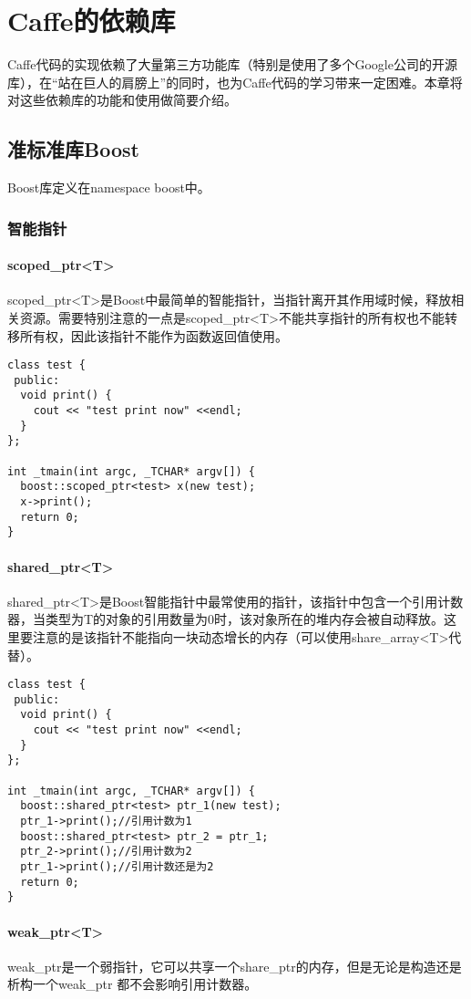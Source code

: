 \chapter{Caffe的依赖库}
Caffe代码的实现依赖了大量第三方功能库（特别是使用了多个Google公司的开源库），在“站在巨人的肩膀上”的同时，也为Caffe代码的学习带来一定困难。本章将对这些依赖库的功能和使用做简要介绍。
\section{准标准库Boost}
Boost库定义在namespace boost中。
\subsection{智能指针}\label{deps/boost/ptr}
\subsubsection{scoped\_ptr<T>}
scoped\_ptr<T>是Boost中最简单的智能指针，当指针离开其作用域时候，释放相关资源。需要特别注意的一点是scoped\_ptr<T>不能共享指针的所有权也不能转移所有权，因此该指针不能作为函数返回值使用。
\begin{verbatim}
class test { 
 public: 
  void print() { 
    cout << "test print now" <<endl; 
  } 
};

int _tmain(int argc, _TCHAR* argv[]) { 
  boost::scoped_ptr<test> x(new test); 
  x->print(); 
  return 0; 
}
\end{verbatim}
\subsubsection{shared\_ptr<T>}
shared\_ptr<T>是Boost智能指针中最常使用的指针，该指针中包含一个引用计数器，当类型为T的对象的引用数量为0时，该对象所在的堆内存会被自动释放。这里要注意的是该指针不能指向一块动态增长的内存（可以使用share\_array<T>代替）。
\begin{verbatim}
class test { 
 public: 
  void print() { 
    cout << "test print now" <<endl; 
  } 
};

int _tmain(int argc, _TCHAR* argv[]) { 
  boost::shared_ptr<test> ptr_1(new test); 
  ptr_1->print();//引用计数为1
  boost::shared_ptr<test> ptr_2 = ptr_1; 
  ptr_2->print();//引用计数为2
  ptr_1->print();//引用计数还是为2
  return 0; 
}
\end{verbatim}
\subsubsection{weak\_ptr<T>}
weak\_ptr是一个弱指针，它可以共享一个share\_ptr的内存，但是无论是构造还是析构一个weak\_ptr 都不会影响引用计数器。
